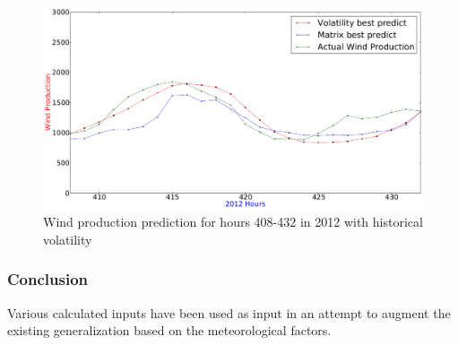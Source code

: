 \begin{figure}[H]
\centering
\includegraphics[width=0.99\linewidth]{billeder/bestVolatility408to432.png}
\caption{Wind production prediction for hours 408-432 in 2012 with historical volatility}
\label{fig:bestVolatility408to432}
\end{figure} 

\subsubsection{Conclusion}
Various calculated inputs have been used as input in an attempt to augment the existing generalization based on the meteorological factors. 

